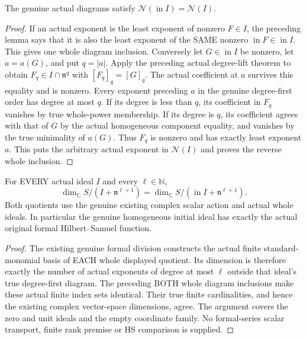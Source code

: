 \begin{theorem}
\label{hir:actual-homogeneous-initial-ideal-diagram-equality}
The genuine actual diagrams satisfy
$\mathcal N(\operatorname{in}I)=\mathcal N(I)$.
\leanok
\end{theorem}
\begin{proof}
If an actual exponent is the least exponent of nonzero $F\in I$,
the preceding lemma says that it is also the least exponent of the
SAME nonzero $\operatorname{in}F\in\operatorname{in}I$. This gives
one whole diagram inclusion.
Conversely let $G\in\operatorname{in}I$ be nonzero, let $a=a(G)$,
and put $q=|a|$. Apply the preceding actual degree-lift theorem to
obtain $F_q\in I\cap\mathfrak n^q$ with $[F_q]_q=[G]_q$.
The actual coefficient at $a$ survives this equality and is nonzero.
Every exponent preceding $a$ in the genuine degree-first order has
degree at most $q$. If its degree is less than $q$, its coefficient
in $F_q$ vanishes by true whole-power membership. If its degree is
$q$, its coefficient agrees with that of $G$ by the actual homogeneous
component equality, and vanishes by the true minimality of $a(G)$.
Thus $F_q$ is nonzero and has exactly least exponent $a$.
This puts the arbitrary actual exponent in $\mathcal N(I)$ and proves
the reverse whole inclusion.
\end{proof}

\begin{theorem}
\label{hir:actual-homogeneous-initial-ideal-hs-equality}
For EVERY actual ideal $I$ and every $\ell\in\mathbb N$,
\[
 \dim_{\mathbb C}S/(I+\mathfrak n^{\ell+1})
 =\dim_{\mathbb C}S/(\operatorname{in}I+\mathfrak n^{\ell+1}).
\]
Both quotients use the genuine existing complex scalar action and
actual whole ideals. In particular the genuine homogeneous initial
ideal has exactly the actual original formal Hilbert--Samuel function.
\leanok
\end{theorem}
\begin{proof}
The existing genuine formal division constructs the actual finite
standard-monomial basis of EACH whole displayed quotient. Its dimension
is therefore exactly the number of actual exponents of degree at most
$\ell$ outside that ideal's true degree-first diagram. The preceding
BOTH whole diagram inclusions make these actual finite index sets
identical. Their true finite cardinalities, and hence the existing
complex vector-space dimensions, agree. The argument covers the zero
and unit ideals and the empty coordinate family. No formal-series
scalar transport, finite rank premise or HS comparison is supplied.
\end{proof}

